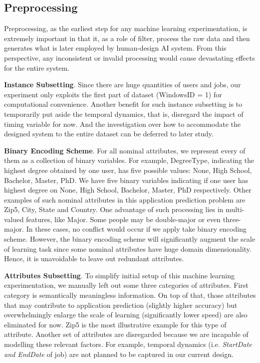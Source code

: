 \documentclass{article} %
\begin{document}
\subsection{Preprocessing} %
Preprocessing, as the earliest step for any machine learning
experimentation, is extremely important in that it, as a role of filter, 
process the raw data and then generates what is later employed by human-design
AI system. From this perspective, any inconsistent or invalid processing would
cause devastating effects for the entire system.

{\bf Instance Subsetting}.
Since there are huge quantities of users and jobs, our experiment only
exploits the first part of dataset (WindowsID = 1) for computational
convenience. Another benefit for such instance subsetting is to temporarily
put aside the temporal dynamics, that is, disregard the impact of timing
variable for now. And the investigation over how to accommodate the designed system
to the entire dataset can be deferred to later study.

{\bf Binary Encoding Scheme}.
For all nominal attributes, we represent every of them as a collection of binary
variables. For example, DegreeType, indicating the highest
degree obtained by one user, has five possible values: None, High
School, Bachelor, Master, PhD. We have five binary variables indicating if one
user has highest degree on None, High School, Bachelor, Master, PhD
respectively. Other examples of such nominal attributes in this application
prediction problem are Zip5, City, State and Country. 
One advantage of such processing lies in multi-valued features, like Major.
Some people may be double-major or even three-major. 
In these cases, no conflict would occur if we apply take binary encoding
scheme. However, the binary encoding scheme will significantly augment the scale of
learning task since some nominal attributes have huge domain dimensionality.
Hence, it is unavoidable to leave out redundant attributes. 

{\bf Attributes Subsetting}.
To simplify initial setup of this machine learning experimentation, we
manually left out some three categories of attributes. First category is
semantically meaningless information. On top of that, those attributes that may contribute to
application prediction (slightly higher accuracy) but overwhelmingly enlarge
the scale of learning (significantly lower speed) are also eliminated for now.
Zip5 is the most illustrative example for this type of attribute.
Another set of attributes are disregarded because we are incapable of
modelling these relevant factors. For example, temporal dynamics (i.e. {\it
    StartDate and EndDate} of job) are not planned to be captured in our
current design. 
\end{document}
